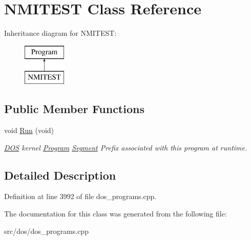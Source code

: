 \hypertarget{classNMITEST}{\section{N\-M\-I\-T\-E\-S\-T Class Reference}
\label{classNMITEST}
}
Inheritance diagram for N\-M\-I\-T\-E\-S\-T\-:\begin{figure}[H]
\begin{center}
\leavevmode
\includegraphics[height=2.000000cm]{classNMITEST}
\end{center}
\end{figure}
\subsection*{Public Member Functions}
\begin{DoxyCompactItemize}
\item 
\hypertarget{classNMITEST_a5ce5aded9d44d5eacd3c640455207076}{void \hyperlink{classNMITEST_a5ce5aded9d44d5eacd3c640455207076}{Run} (void)}\label{classNMITEST_a5ce5aded9d44d5eacd3c640455207076}

\begin{DoxyCompactList}\small\item\em \hyperlink{classDOS}{D\-O\-S} kernel \hyperlink{classProgram}{Program} \hyperlink{structSegment}{Segment} Prefix associated with this program at runtime. \end{DoxyCompactList}\end{DoxyCompactItemize}


\subsection{Detailed Description}


Definition at line 3992 of file dos\-\_\-programs.\-cpp.



The documentation for this class was generated from the following file\-:\begin{DoxyCompactItemize}
\item 
src/dos/dos\-\_\-programs.\-cpp\end{DoxyCompactItemize}
